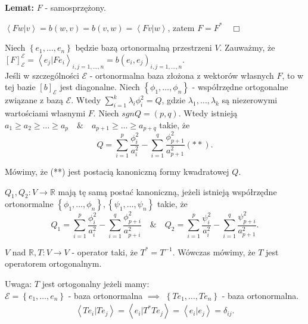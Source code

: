 \documentclass[../main.tex]{subfiles}
\begin{document}
    \vspace{0.5cm}
    \noindent\textbf{Lemat:} $F$ - samosprzężony.
    \begin{dowod}
        $\left<Fw|v \right> = b(w,v) = b(v,w) = \left<Fv|w \right>$, zatem $F = F^*\quad\Box$
    \end{dowod}
    Niech $\left\{ e_1,\ldots,e_n \right\} $ będzie bazą ortonormalną przestrzeni $V$. Zauważmy, że $\left[ F \right] _\mathcal{E}^\mathcal{E} = \left< e_j|Fe_i \right>_{i,j = 1,\ldots,n} = b(e_i,e_j)_{i,j = 1,\ldots,n}$.\\
    Jeśli w szczególności $\mathcal{E}$ - ortonormalna baza złożona z wektorów własnych $F$, to w tej bazie $\left[b\right]_\mathcal{E}$ jest diagonalne. Niech $\left\{ \phi_1,\ldots,\phi_n \right\} $ - współrzędne ortogonalne związane z bazą $\mathcal{E}$. Wtedy $\sum_{i=1}^k \lambda_i\phi_i^2 = Q$, gdzie $\lambda_1,\ldots,\lambda_k$ są niezerowymi wartościami własnymi $F$. Niech $sgn Q = (p,q)$. Wtedy istnieją $a_1 \ge a_2 \ge \ldots \ge a_p \quad\&\quad a_{p+1}\ge\ldots\ge a_{p+q}$ takie, że
    \[
        Q = \sum_{i=1}^p \frac{\phi_i^2}{a_i^2} - \sum_{i=1}^q \frac{\phi_{p+1}^2}{a_{p+1}^2} (**)
    .\]
    \begin{definicja}
        Mówimy, że (**) jest postacią kanoniczną formy kwadratowej $Q$.
    \end{definicja}
    \begin{definicja}
        $Q_1,Q_2: V\to \mathbb{R}$ mają tę samą postać kanoniczną, jeżeli istnieją współrzędne ortonormalne $\left\{ \phi_1,\ldots,\phi_n \right\} , \left\{ \psi_1,\ldots,\psi_n \right\} $ takie, że
        \[
            Q_1 = \sum_{i=1}^p \frac{\phi_i^2}{a_i^2} - \sum_{i=1}^q \frac{\phi_{p+i}^2}{a_{p+i}^2} \quad\&\quad Q_2 = \sum_{i=1}^p \frac{\psi_i^2}{a_i^2} - \sum_{i=1}^q \frac{\psi_{p+i}^2}{a_{p+1}^2}
        .\]
    \end{definicja}
    \begin{definicja}
        $V$ nad $\mathbb{R}, T:V\to V$ - operator taki, że $T^* = T^{-1}$. Wówczas mówimy, że $T$ jest operatorem ortogonalnym.
    \end{definicja}
    Uwaga: $T$ jest ortogonalny jeżeli mamy:\\
    $\mathcal{E} = \left\{ e_1,\ldots,e_n \right\} $ - baza ortonormalna $\implies$ $\left\{ Te_1,\ldots,Te_n \right\} $ - baza ortonormalna.\\
    \begin{align*}
        \left<Te_i|Te_j \right> = \left<e_i|T^*Te_j \right> = \left<e_i|e_j \right> = \delta_{ij}
    .\end{align*}
\end{document}
